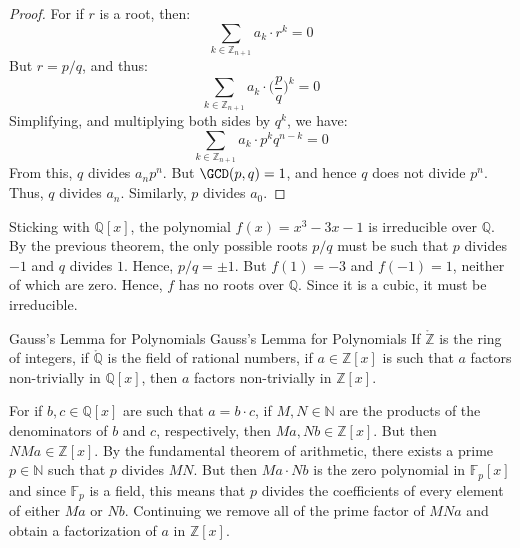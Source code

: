 \documentclass{article}                                                        %
\begin{document}
        \begin{proof}
            For if $r$ is a root, then:
            \begin{equation}
                \sum_{k\in\mathbb{Z}_{n+1}}a_{k}\cdot{r}^{k}=0
            \end{equation}
            But $r=p/q$, and thus:
            \begin{equation}
                \sum_{k\in\mathbb{Z}_{n+1}}a_{k}\cdot\big(\frac{p}{q}\big)^{k}
                =0
            \end{equation}
            Simplifying, and multiplying both sides by $q^{k}$, we have:
            \begin{equation}
                \sum_{k\in\mathbb{Z}_{n+1}}a_{k}\cdot{p}^{k}q^{n-k}=0
            \end{equation}
            From this, $q$ divides $a_{n}p^{n}$. But $\GCD(p,q)=1$, and hence
            $q$ does not divide $p^{n}$. Thus, $q$ divides $a_{n}$. Similarly,
            $p$ divides $a_{0}$.
        \end{proof}
        \begin{example}
            Sticking with $\mathbb{Q}[x]$, the polynomial $f(x)=x^{3}-3x-1$ is
            irreducible over $\mathbb{Q}$. By the previous theorem, the only
            possible roots $p/q$ must be such that $p$ divides $\minus{1}$ and
            $q$ divides $1$. Hence, $p/q=\pm{1}$. But $f(1)=\minus{3}$ and
            $f(\minus{1})=1$, neither of which are zero. Hence, $f$ has no roots
            over $\mathbb{Q}$. Since it is a cubic, it must be irreducible.
        \end{example}
        \begin{ftheorem}{Gauss's Lemma for Polynomials}
                        {Gauss's Lemma for Polynomials}
            If $\ring{\mathbb{Z}}$ is the ring of integers, if
            $\ring{\mathbb{Q}}$ is the field of rational numbers, if
            $a\in{\mathbb{Z}}[x]$ is such that $a$ factors non-trivially in
            $\mathbb{Q}[x]$, then $a$ factors non-trivially in $\mathbb{Z}[x]$.
        \end{ftheorem}
        \begin{bproof}
            For if $b,c\in\mathbb{Q}[x]$ are such that $a=b\cdot{c}$, if
            $M,N\in\mathbb{N}$ are the products of the denominators of $b$
            and $c$, respectively, then $Ma,Nb\in\mathbb{Z}[x]$. But then
            $NMa\in\mathbb{Z}[x]$. By the fundamental theorem of arithmetic,
            there exists a prime $p\in\mathbb{N}$ such that $p$ divides $MN$.
            But then $Ma\cdot{N}b$ is the zero polynomial in $\mathbb{F}_{p}[x]$
            and since $\mathbb{F}_{p}$ is a field, this means that $p$ divides
            the coefficients of every element of either $Ma$ or $Nb$. Continuing
            we remove all of the prime factor of $MNa$ and obtain a
            factorization of $a$ in $\mathbb{Z}[x]$.
        \end{bproof}
\end{document}
